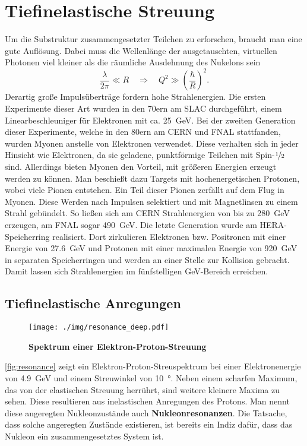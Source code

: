 \chapter{Tiefinelastische Streuung}
Um die Substruktur zusammengesetzter Teilchen zu erforschen, braucht man eine gute Auflösung.
Dabei muss die Wellenlänge der ausgetauschten, virtuellen Photonen viel kleiner als die räumliche Ausdehnung des Nukelons sein
\begin{equation*}
	\frac{\lambda}{2\pi}\ll R\quad\Rightarrow\quad Q^2 \gg \left(\frac{\hbar}{R}\right)^2.
\end{equation*}
Derartig große Impulsüberträge fordern hohe Strahlenergien.
Die ersten Experimente dieser Art wurden in den 70ern am SLAC durchgeführt, einem Linearbeschleuniger für Elektronen mit ca. \SI{25}{\GeV}.
Bei der zweiten Generation dieser Experimente, welche in den 80ern am CERN und FNAL stattfanden, wurden Myonen anstelle von Elektronen verwendet.
Diese verhalten sich in jeder Hinsicht wie Elektronen, da sie geladene, punktförmige Teilchen mit Spin-$\nicefrac{1}{2}$ sind.
Allerdings bieten Myonen den Vorteil, mit größeren Energien erzeugt werden zu können.
Man beschießt dazu Targets mit hochenergetischen Protonen, wobei viele Pionen entstehen.
Ein Teil dieser Pionen zerfällt auf dem Flug in Myonen.
Diese Werden nach Impulsen selektiert und mit Magnetlinsen zu einem Strahl gebündelt.
So ließen sich am CERN Strahlenergien von bis zu \SI{280}{\GeV} erzeugen, am FNAL sogar \SI{490}{\GeV}.
Die letzte Generation wurde am HERA-Speicherring realisiert.
Dort zirkulieren Elektronen bzw. Positronen mit einer Energie von \SI{27.6}{\GeV} und Protonen mit einer maximalen Energie von \SI{920}{\GeV} in separaten Speicherringen und werden an einer Stelle zur Kollision gebracht.
Damit lassen sich Strahlenergien im fünfstelligen \si{\GeV}-Bereich erreichen.

\section{Tiefinelastische Anregungen}
\begin{figure}
	\centering
	\texttt{[image: ./img/resonance\_deep.pdf]}
	\caption{\textbf{Spektrum einer Elektron-Proton-Streuung}}
	\label{fig:resonance}
\end{figure}
\autoref{fig:resonance} zeigt ein Elektron-Proton-Streuspektrum bei einer Elektronenergie von \SI{4.9}{\GeV} und einem Streuwinkel von \SI{10}{\degree}.
Neben einem scharfen Maximum, das von der elastischen Streuung herrührt, sind weitere kleinere Maxima zu sehen.
Diese resultieren aus inelastischen Anregungen des Protons.
Man nennt diese angeregten Nukleonzustände auch \textbf{Nukleonresonanzen}.
Die Tatsache, dass solche angeregten Zustände existieren, ist bereits ein Indiz dafür, dass das Nukleon ein zusammengesetztes System ist.

